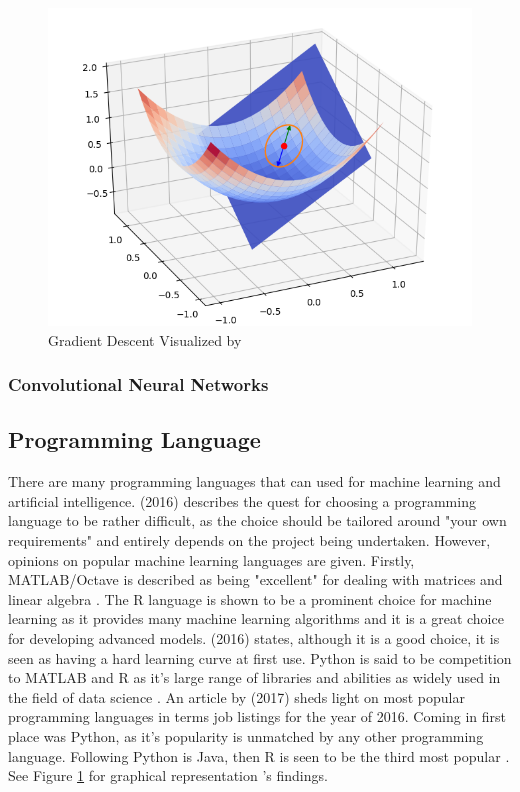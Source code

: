 \begin{figure}[ht]
	\begin{center}
		\advance\leftskip-3cm
		\advance\rightskip-3cm
		\includegraphics[keepaspectratio=true,scale=0.8]{__resources/design/gd.png}
		\caption{Gradient Descent Visualized by \cite{vigier_2017}}
		\label{verma}
	\end{center}
\end{figure}

\subsubsection{Convolutional Neural Networks}




\subsection{Programming Language}
There are many programming languages that can used for machine learning and artificial intelligence. \citeauthor{brownlee} (2016) describes the quest for choosing a programming language to be rather difficult, as the choice should be tailored around "your own requirements" and entirely depends on the project being undertaken. However, opinions on popular machine learning languages are given. Firstly, MATLAB/Octave is described as being "excellent" for dealing with matrices and linear algebra \citep{brownlee}. The R language is shown to be a prominent choice for machine learning as it provides many machine learning algorithms and it is a great choice for developing advanced models. \citeauthor{brownlee} (2016) states, although it is a good choice, it is seen as having a hard learning curve at first use. Python is said to be competition to MATLAB and R as it's large range of libraries and abilities as widely used in the field of data science \citep{brownlee}.
An article by \citeauthor{verma_2017} (2017) sheds light on most popular programming languages in terms job listings for the year of 2016. Coming in first place was Python, as it's popularity is unmatched by any other programming language. Following Python is Java, then R is seen to be the third most popular \citep{verma_2017}. See Figure \ref{verma} for graphical representation \citeauthor{verma_2017}'s findings.


